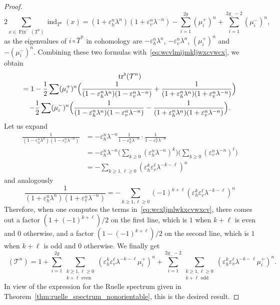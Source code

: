 \documentclass[JEP,XML,SOM,Unicode]{cedram}
\newcommand{\boT}{\mathcal{T}}
\newcommand{\pareB}[1]{\Bigl(#1\Bigr)}
\newcommand{\paregg}[1]{\biggl(#1\biggr)}
\DeclareMathOperator{\ind}{ind}
\DeclareMathOperator{\Fix}{Fix}
\DeclareMathOperator{\flattr}{\mathrm{tr}^{\flat}}
\let\epsilon\varepsilon
\theoremstyle{definition}
\numberwithin{equation}{section}
\begin{document}
\begin{proof}
\begin{equation*}
2\sum_{x \in \Fix^-(T^n)} \ind_{T^n}(x) = (1+\epsilon_h^n \lambda^n) (1+\epsilon_v^n \lambda^{-n}) - \sum_{i=1}^{2g} (\mu_i^+)^n + \sum_{i=1}^{2g_--2} (\mu_i^-)^n,
\end{equation*}
as the eigenvalues of $i\circ \bar T^n$ in cohomology are $-\epsilon_h^n
\lambda^n$, $-\epsilon_v^n \lambda^n$, $(\mu_i^+)^n$ and $-(\mu_i^-)^n$.
Combining these two formulas with~\eqref{eq:wcvlmijmkljwxcvwcx}, we obtain\vspace*{-3pt}
\begin{multline}
\label{eq:wcxljmlwkxcvwxcv}
\flattr(\boT^n) \\[-3pt]
= 1  -\frac{1}{2} \sum (\mu_i^+)^n
\pareB{\frac{1}{(1-\epsilon_h^n \lambda^n) (1-\epsilon_v^n \lambda^{-n})} + \frac{1}{(1+\epsilon_h^n \lambda^n) (1+\epsilon_v^n \lambda^{-n})}}
\\ 
- \frac{1}{2} \sum (\mu_i^-)^n
\pareB{\frac{1}{(1-\epsilon_h^n \lambda^n) (1-\epsilon_v^n \lambda^{-n})} - \frac{1}{(1+\epsilon_h^n \lambda^n) (1+\epsilon_v^n \lambda^{-n})}}.
\end{multline}
Let us expand\vspace*{-3pt}
\begin{align*}
\frac{1}{(1-\epsilon_h^n \lambda^n) (1-\epsilon_v^n \lambda^{-n})}
& = -\epsilon_h^n \lambda^{-n} \frac{1}{1-\epsilon_h^n \lambda^{-n}}\cdot \frac{1}{1-\epsilon_v^n \lambda^{-n}}
\\& = -\epsilon_h^n \lambda^{-n} \paregg{\sum_{k\geq 0} (\epsilon_h^n \lambda^{-n})^k} \paregg{\sum_{k\geq 0} (\epsilon_v^n \lambda^{-n})^\ell}
\\& = - \sum_{k\geq 1, \ell \geq 0} (\epsilon_h^k \epsilon_v^\ell \lambda^{-k-\ell})^n
\end{align*}
and analogously\vspace*{-3pt}
\begin{equation*}
\frac{1}{(1+\epsilon_h^n \lambda^n) (1+\epsilon_v^n \lambda^{-n})}
= - \sum_{k\geq 1, \ell \geq 0} (-1)^{k+\ell} (\epsilon_h^k \epsilon_v^\ell \lambda^{-k-\ell})^n
\end{equation*}
Therefore, when one computes the terms in~\eqref{eq:wcxljmlwkxcvwxcv}, there
comes out a factor \hbox{$(1+(-1)^{k+\ell})/2$} on the first line, which is $1$ when
$k+\ell$ is even and $0$ otherwise, and a factor $(1-(-1)^{k+\ell})/2$ on the
second line, which is $1$ when $k+\ell$ is odd and $0$ otherwise. We finally
get\vspace*{-3pt}
\begin{equation*}
\flattr(\boT^n) = 1 + \sum_{i=1}^{2g} \sum_{\substack{k \geq 1, \ell \geq 0\\k + \ell \text{ even}}} (\epsilon_h^k \epsilon_v^\ell \lambda^{-k-\ell}\mu_i^+)^n
+ \sum_{i=1}^{2g_--2} \sum_{\substack{k \geq 1, \ell \geq 0\\k + \ell \text{ odd}}} (\epsilon_h^k \epsilon_v^\ell \lambda^{-k-\ell}\mu_i^+)^n.
\end{equation*}
In view of the expression for the Ruelle spectrum given in
Theorem~\ref{thm:ruelle_spectrum_nonorientable}, this is the desired result.
\end{proof}




\end{document}
